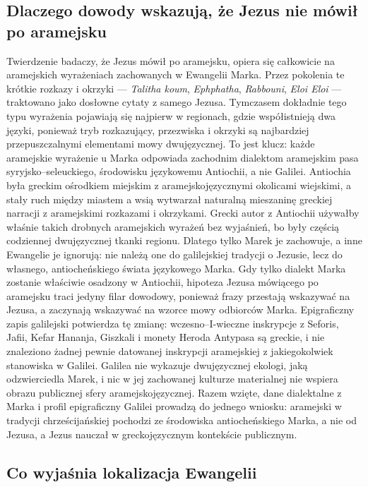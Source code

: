 \subsection{Dlaczego dowody wskazują, że Jezus nie mówił po aramejsku}

Twierdzenie badaczy, że Jezus mówił po aramejsku, opiera się całkowicie na aramejskich wyrażeniach zachowanych w Ewangelii Marka.
Przez pokolenia te krótkie rozkazy i okrzyki — \textit{Talitha koum}, \textit{Ephphatha}, \textit{Rabbouni}, \textit{Eloi Eloi} — traktowano jako dosłowne cytaty z samego Jezusa.
Tymczasem dokładnie tego typu wyrażenia pojawiają się najpierw w regionach, gdzie współistnieją dwa języki, ponieważ tryb rozkazujący, przezwiska i okrzyki są najbardziej przepuszczalnymi elementami mowy dwujęzycznej.
To jest klucz: każde aramejskie wyrażenie u Marka odpowiada zachodnim dialektom aramejskim pasa syryjsko–seleuckiego, środowisku językowemu Antiochii, a nie Galilei.
Antiochia była greckim ośrodkiem miejskim z aramejskojęzycznymi okolicami wiejskimi, a stały ruch między miastem a wsią wytwarzał naturalną mieszaninę greckiej narracji z aramejskimi rozkazami i okrzykami.
Grecki autor z Antiochii używałby właśnie takich drobnych aramejskich wyrażeń bez wyjaśnień, bo były częścią codziennej dwujęzycznej tkanki regionu.
Dlatego tylko Marek je zachowuje, a inne Ewangelie je ignorują: nie należą one do galilejskiej tradycji o Jezusie, lecz do własnego, antiocheńskiego świata językowego Marka.
Gdy tylko dialekt Marka zostanie właściwie osadzony w Antiochii, hipoteza Jezusa mówiącego po aramejsku traci jedyny filar dowodowy, ponieważ frazy przestają wskazywać na Jezusa, a zaczynają wskazywać na wzorce mowy odbiorców Marka.
Epigraficzny zapis galilejski potwierdza tę zmianę: wczesno–I-wieczne inskrypcje z Seforis, Jafii, Kefar Hananja, Giszkali i monety Heroda Antypasa są greckie, i nie znaleziono żadnej pewnie datowanej inskrypcji aramejskiej z jakiegokolwiek stanowiska w Galilei.
Galilea nie wykazuje dwujęzycznej ekologi, jaką odzwierciedla Marek, i nic w jej zachowanej kulturze materialnej nie wspiera obrazu publicznej sfery aramejskojęzycznej.
Razem wzięte, dane dialektalne z Marka i profil epigraficzny Galilei prowadzą do jednego wniosku: aramejski w tradycji chrześcijańskiej pochodzi ze środowiska antiocheńskiego Marka, a nie od Jezusa, a Jezus nauczał w greckojęzycznym kontekście publicznym.

\subsection{Co wyjaśnia lokalizacja Ewangelii}

